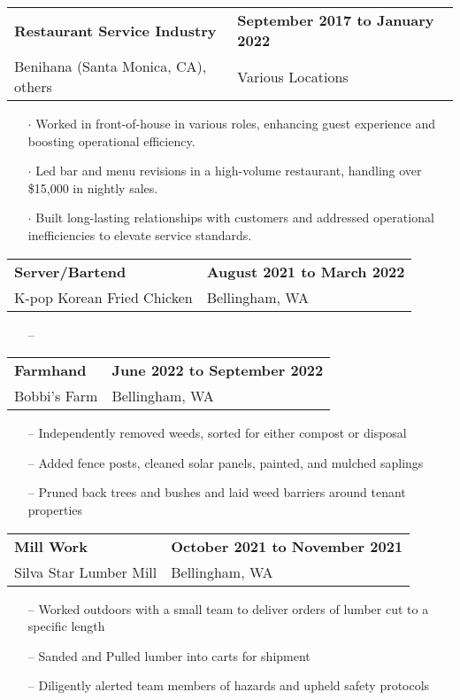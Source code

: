 \documentclass[11pt,letterpaper]{article}
\begin{document}
\begin{tabularx}{\textwidth}{lX}
    \textbf{Restaurant Service Industry} & \hfill \textbf{September 2017 to January 2022} \\[0pt]
    \small
    Benihana (Santa Monica, CA), others & \hfill Various Locations \\[0pt]
\end{tabularx}
\begin{itemize}
    \small
    \item[$\cdot$] Worked in front-of-house in various roles, enhancing guest experience and boosting operational efficiency.
    \item[$\cdot$] Led bar and menu revisions in a high-volume restaurant, handling over \$15,000 in nightly sales.
    \item[$\cdot$] Built long-lasting relationships with customers and addressed operational inefficiencies to elevate service standards.
\end{itemize}

\begin{tabularx}{\textwidth}{lX}
    \textbf{Server/Bartend} & \hfill \textbf{August 2021 to March 2022} \\[0pt]
    \small K-pop Korean Fried Chicken & \hfill Bellingham, WA  \\[0pt]
\end{tabularx}
\begin{itemize}
    \small
    \item[--] 
\end{itemize}

\begin{tabularx}{\textwidth}{lX}
    \textbf{Farmhand} & \hfill \textbf{June 2022 to September 2022} \\[3.75pt]
    Bobbi’s Farm & \hfill Bellingham, WA \\[3.75pt]
\end{tabularx}
\begin{itemize}
    \item[--] Independently removed weeds, sorted for either compost or disposal
    \item[--] Added fence posts, cleaned solar panels, painted, and mulched saplings
    \item[--] Pruned back trees and bushes and laid weed barriers around tenant properties
\end{itemize}

\begin{tabularx}{\textwidth}{lX}
    \textbf{Mill Work} & \hfill \textbf{October 2021 to November 2021} \\[3.75pt]
    Silva Star Lumber Mill & \hfill Bellingham, WA  \\[3.75pt]
\end{tabularx}
\begin{itemize}
    \item[--] Worked outdoors with a small team to deliver orders of lumber cut to a specific length 
    \item[--] Sanded and Pulled lumber into carts for shipment
    \item[--] Diligently alerted team members of hazards and upheld safety protocols
\end{itemize}
\end{document}
